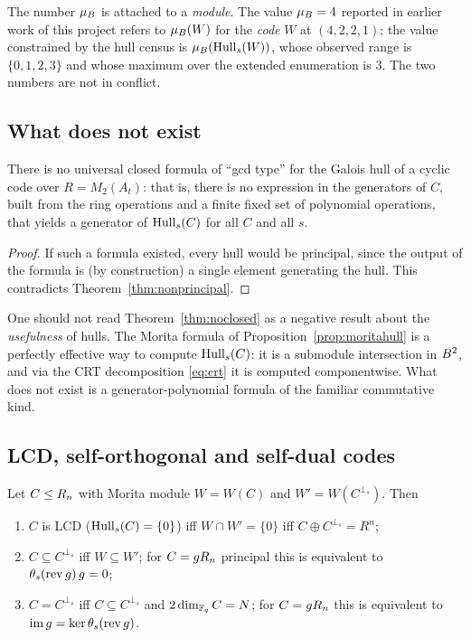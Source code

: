 \begin{remark}[a disambiguation]\label{rem:mub}
The number $\mu_B$ is attached to a \emph{module}. The value $\mu_B=4$ reported
in earlier work of this project refers to $\mu_B(W)$ for the \emph{code}
$W$ at $(4,2,2,1)$; the value constrained by the hull census is
$\mu_B(\operatorname{Hull}_s(W))$, whose observed range is $\{0,1,2,3\}$ and whose maximum
over the extended enumeration is $3$. The two numbers are not in conflict.
\end{remark}

\subsection{What does not exist}

\begin{theorem}\label{thm:noclosed}
There is no universal closed formula of ``gcd type'' for the Galois hull of a
cyclic code over $R=M_2(A_t)$: that is, there is no expression in the
generators of $C$, built from the ring operations and a finite fixed set of
polynomial operations, that yields a generator of $\operatorname{Hull}_s(C)$ for all $C$ and
all $s$.
\end{theorem}

\begin{proof}
If such a formula existed, every hull would be principal, since the output of
the formula is (by construction) a single element generating the hull. This
contradicts Theorem~\ref{thm:nonprincipal}.
\end{proof}

\begin{remark}
One should not read Theorem~\ref{thm:noclosed} as a negative result about the
\emph{usefulness} of hulls. The Morita formula of
Proposition~\ref{prop:moritahull} is a perfectly effective way to compute
$\operatorname{Hull}_s(C)$: it is a submodule intersection in $B^2$, and via the CRT
decomposition \eqref{eq:crt} it is computed componentwise. What does not exist
is a generator-polynomial formula of the familiar commutative kind.
\end{remark}

\subsection{LCD, self-orthogonal and self-dual codes}

\begin{proposition}\label{prop:lcdso}
Let $C\le R_n$ with Morita module $W=W(C)$ and $W'=W(C^{\perp_s})$. Then
\begin{enumerate}[label=\textnormal{(\alph*)},leftmargin=*]
\item $C$ is LCD ($\operatorname{Hull}_s(C)=\{0\}$) iff $W\cap W'=\{0\}$ iff
  $C\oplus C^{\perp_s}=R^n$;
\item $C\subseteq C^{\perp_s}$ iff $W\subseteq W'$; for $C=gR_n$ principal
  this is equivalent to $\theta_s(\operatorname{rev} g)\,g=0$;
\item $C=C^{\perp_s}$ iff $C\subseteq C^{\perp_s}$ and $2\dim_{\mathbb F_q}C=N$;
  for $C=gR_n$ this is equivalent to $\operatorname{im} g=\ker\theta_s(\operatorname{rev} g)$.
\end{enumerate}
\end{proposition}

